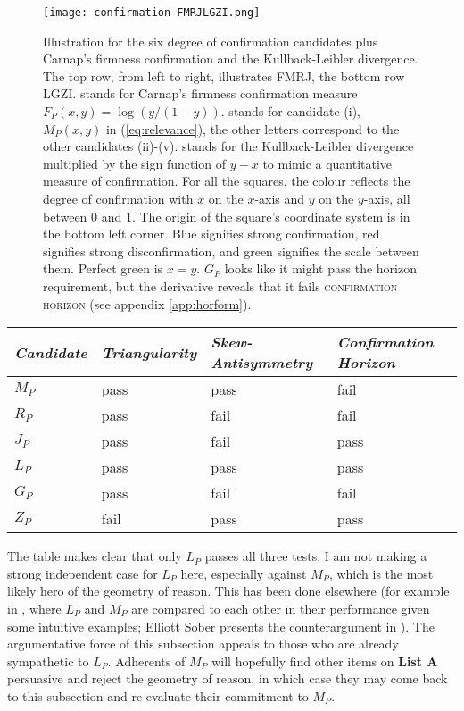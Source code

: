 \documentclass[11pt]{article}
\begin{document}
\begin{figure}[ht]
    \begin{minipage}[h]{\linewidth}
      \texttt{[image: confirmation-FMRJLGZI.png]}
      \caption{\footnotesize Illustration for the six degree of
        confirmation candidates plus Carnap's firmness confirmation
        and the Kullback-Leibler divergence. The top row, from left to
        right, illustrates FMRJ, the bottom row LGZI.  stands
        for Carnap's firmness confirmation measure
        $F_{P}(x,y)=\log(y/(1-y))$.  stands for candidate
        (i), $M_{P}(x,y)$ in (\ref{eq:relevance}), the other letters
        correspond to the other candidates (ii)-(v).  stands
        for the Kullback-Leibler divergence multiplied by the sign
        function of $y-x$ to mimic a quantitative measure of
        confirmation. For all the squares, the colour reflects the
        degree of confirmation with $x$ on the $x$-axis and $y$ on the
        $y$-axis, all between $0$ and $1$. The origin of the square's
        coordinate system is in the bottom left corner. Blue signifies
        strong confirmation, red signifies strong disconfirmation, and
        green signifies the scale between them. Perfect green is
        $x=y$. $G_{P}$ looks like it might pass the horizon
        requirement, but the derivative reveals that it fails
        \textsc{confirmation horizon} (see appendix
        \ref{app:horform}).}
      \label{fig:doconf}
\end{minipage}
\end{figure}

\begin{tabular}{|l|l|l|l|}\hline
  \emph{Candidate} & \emph{Triangularity} & \emph{Skew-Antisymmetry} & \emph{Confirmation Horizon} \\ \hline
  $M_{P}$ & pass & pass & fail \\ \hline
  $R_{P}$ & pass & fail & fail \\ \hline
  $J_{P}$ & pass & fail & pass \\ \hline
  $L_{P}$ & pass & pass & pass \\ \hline
  $G_{P}$ & pass & fail & fail \\ \hline
  $Z_{P}$ & fail & pass & pass \\ \hline
\end{tabular}

The table makes clear that only $L_{P}$ passes all three tests. I am
not making a strong independent case for $L_{P}$ here, especially
against $M_{P}$, which is the most likely hero of the geometry of
reason. This has been done elsewhere (for example in
, where $L_{P}$ and $M_{P}$ are compared to
each other in their performance given some intuitive examples; Elliott
Sober presents the counterargument in ). The
argumentative force of this subsection appeals to those who are
already sympathetic to $L_{P}$. Adherents of $M_{P}$ will hopefully
find other items on \textbf{List A} persuasive and reject the geometry
of reason, in which case they may come back to this subsection and
re-evaluate their commitment to $M_{P}$.
\end{document}
